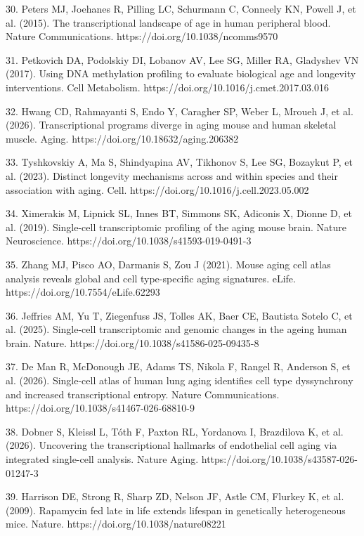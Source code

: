 \documentclass[11pt]{article}
\begin{document}
30. Peters MJ, Joehanes R, Pilling LC, Schurmann C, Conneely KN, Powell J, et al. (2015). The transcriptional landscape of age in human peripheral blood. Nature Communications. https://doi.org/10.1038/ncomms9570

31. Petkovich DA, Podolskiy DI, Lobanov AV, Lee SG, Miller RA, Gladyshev VN (2017). Using DNA methylation profiling to evaluate biological age and longevity interventions. Cell Metabolism. https://doi.org/10.1016/j.cmet.2017.03.016

32. Hwang CD, Rahmayanti S, Endo Y, Caragher SP, Weber L, Mroueh J, et al. (2026). Transcriptional programs diverge in aging mouse and human skeletal muscle. Aging. https://doi.org/10.18632/aging.206382

33. Tyshkovskiy A, Ma S, Shindyapina AV, Tikhonov S, Lee SG, Bozaykut P, et al. (2023). Distinct longevity mechanisms across and within species and their association with aging. Cell. https://doi.org/10.1016/j.cell.2023.05.002

34. Ximerakis M, Lipnick SL, Innes BT, Simmons SK, Adiconis X, Dionne D, et al. (2019). Single-cell transcriptomic profiling of the aging mouse brain. Nature Neuroscience. https://doi.org/10.1038/s41593-019-0491-3

35. Zhang MJ, Pisco AO, Darmanis S, Zou J (2021). Mouse aging cell atlas analysis reveals global and cell type-specific aging signatures. eLife. https://doi.org/10.7554/eLife.62293

36. Jeffries AM, Yu T, Ziegenfuss JS, Tolles AK, Baer CE, Bautista Sotelo C, et al. (2025). Single-cell transcriptomic and genomic changes in the ageing human brain. Nature. https://doi.org/10.1038/s41586-025-09435-8

37. De Man R, McDonough JE, Adams TS, Nikola F, Rangel R, Anderson S, et al. (2026). Single-cell atlas of human lung aging identifies cell type dyssynchrony and increased transcriptional entropy. Nature Communications. https://doi.org/10.1038/s41467-026-68810-9

38. Dobner S, Kleissl L, T\'oth F, Paxton RL, Yordanova I, Brazdilova K, et al. (2026). Uncovering the transcriptional hallmarks of endothelial cell aging via integrated single-cell analysis. Nature Aging. https://doi.org/10.1038/s43587-026-01247-3

39. Harrison DE, Strong R, Sharp ZD, Nelson JF, Astle CM, Flurkey K, et al. (2009). Rapamycin fed late in life extends lifespan in genetically heterogeneous mice. Nature. https://doi.org/10.1038/nature08221
\end{document}
